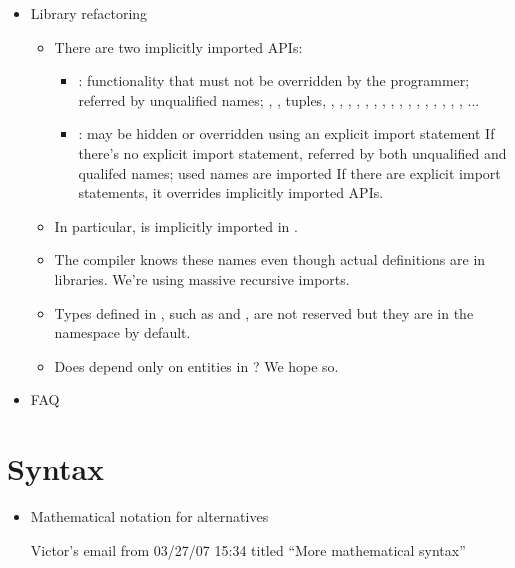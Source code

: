 \begin{itemize}
\item Library refactoring
 \begin{itemize}
 \item
There are two implicitly imported APIs:
  \begin{itemize}
  \item
{}:
functionality that must not be overridden by the programmer;
referred by unqualified names; \EXP{()}, \EXP{\rightarrow}, tuples,
, , , ,
, , , ,
, , , ,
, , \EXP{\sequiv},
, ...
  \item
{}:
may be hidden or overridden using an explicit import statement
If there's no explicit import statement,
referred by both unqualified and qualifed names; used names are imported
If there are explicit import statements,
it overrides implicitly imported APIs.
  \end{itemize}
 \item
In particular,  is implicitly imported in .
 \item
The compiler knows these names even though actual definitions are in libraries. We're using massive recursive imports.
 \item
Types defined in , such as  and , are not reserved but they are in the namespace by default.
 \item
Does  depend only on entities in ? We hope so.
 \end{itemize}

\item FAQ

\end{itemize}

\section{Syntax}
\begin{itemize}
\item Mathematical notation for alternatives

Victor's email from 03/27/07 15:34
titled ``More mathematical syntax''

\end{itemize}

